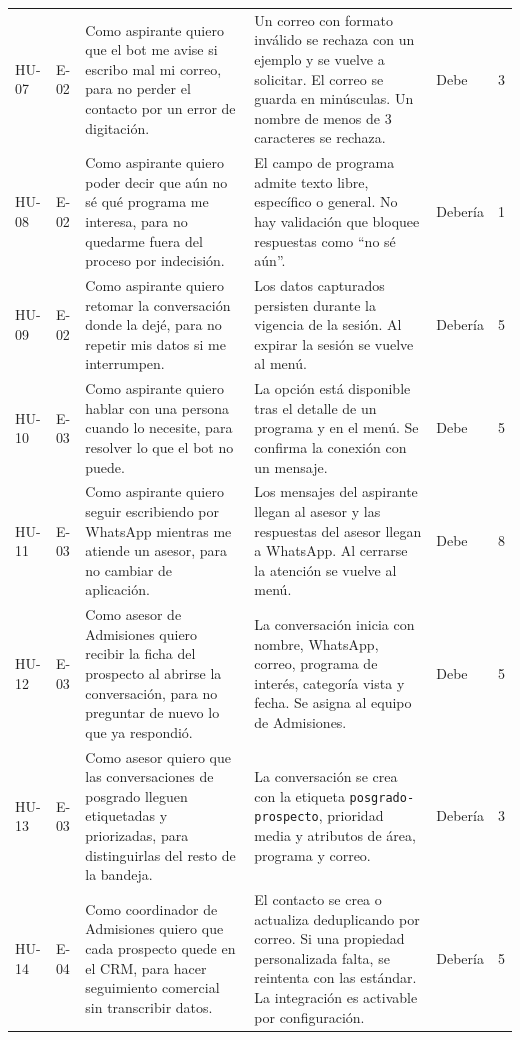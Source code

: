 \documentclass[12pt,a4paper]{report}
\begin{document}
{\begin{longtable}{p{1.2cm}p{0.9cm}p{5.2cm}p{5.0cm}p{1.1cm}p{0.7cm}}
HU-07 & E-02 & Como aspirante quiero que el bot me avise si escribo mal mi correo, para no perder el contacto por un error de digitación. & Un correo con formato inválido se rechaza con un ejemplo y se vuelve a solicitar. El correo se guarda en minúsculas. Un nombre de menos de 3 caracteres se rechaza. & Debe & 3 \\
HU-08 & E-02 & Como aspirante quiero poder decir que aún no sé qué programa me interesa, para no quedarme fuera del proceso por indecisión. & El campo de programa admite texto libre, específico o general. No hay validación que bloquee respuestas como ``no sé aún''. & Debería & 1 \\
HU-09 & E-02 & Como aspirante quiero retomar la conversación donde la dejé, para no repetir mis datos si me interrumpen. & Los datos capturados persisten durante la vigencia de la sesión. Al expirar la sesión se vuelve al menú. & Debería & 5 \\
HU-10 & E-03 & Como aspirante quiero hablar con una persona cuando lo necesite, para resolver lo que el bot no puede. & La opción está disponible tras el detalle de un programa y en el menú. Se confirma la conexión con un mensaje. & Debe & 5 \\
HU-11 & E-03 & Como aspirante quiero seguir escribiendo por WhatsApp mientras me atiende un asesor, para no cambiar de aplicación. & Los mensajes del aspirante llegan al asesor y las respuestas del asesor llegan a WhatsApp. Al cerrarse la atención se vuelve al menú. & Debe & 8 \\
HU-12 & E-03 & Como asesor de Admisiones quiero recibir la ficha del prospecto al abrirse la conversación, para no preguntar de nuevo lo que ya respondió. & La conversación inicia con nombre, WhatsApp, correo, programa de interés, categoría vista y fecha. Se asigna al equipo de Admisiones. & Debe & 5 \\
HU-13 & E-03 & Como asesor quiero que las conversaciones de posgrado lleguen etiquetadas y priorizadas, para distinguirlas del resto de la bandeja. & La conversación se crea con la etiqueta \texttt{posgrado-prospecto}, prioridad media y atributos de área, programa y correo. & Debería & 3 \\
HU-14 & E-04 & Como coordinador de Admisiones quiero que cada prospecto quede en el CRM, para hacer seguimiento comercial sin transcribir datos. & El contacto se crea o actualiza deduplicando por correo. Si una propiedad personalizada falta, se reintenta con las estándar. La integración es activable por configuración. & Debería & 5 \\

\end{longtable}}
\end{document}
